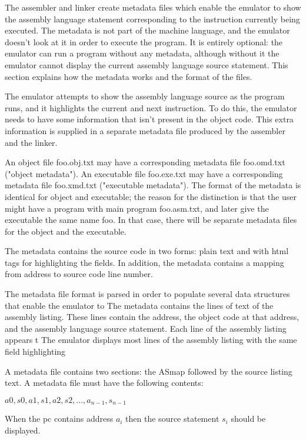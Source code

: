 \documentclass[11pt]{article}
\begin{document}
The assembler and linker create metadata files which enable the
emulator to show the assembly language statement corresponding to the
instruction currently being executed.  The metadata is not part of the
machine language, and the emulator doesn't look at it in order to
execute the program.  It is entirely optional: the emulator can run a
program without any metadata, although without it the emulator cannot
display the current assembly language source statement.  This section
explains how the metadata works and the format of the files.

The emulator attempts to show the assembly language source as the
program runs, and it highlights the current and next instruction.  To
do this, the emulator needs to have some information that isn't
present in the object code.  This extra information is supplied in a
separate metadata file produced by the assembler and the linker.

An object file foo.obj.txt may have a corresponding metadata file
foo.omd.txt ("object metadata").  An executable file foo.exe.txt may
have a corresponding metadata file foo.xmd.txt ("executable
metadata").  The format of the metadata is identical for object and
executable; the reason for the distinction is that the user might have
a program with main program foo.asm.txt, and later give the executable
the same name foo.  In that case, there will be separate metadata
files for the object and the executable.

  The metadata contains the source code in two forms:
plain text and with html tags for highlighting the fields.  In
addition, the metadata contains a mapping from address to source code
line number.

The metadata file format is parsed in order to populate several data
structures that enable the emulator to 
The metadata contains the lines of text of the assembly listing.
These lines contain the address, the object code at that address, and
the assembly language source statement.  Each line of the assembly
listing appears t  The emulator displays most
lines of the assembly listing with the same field highlighting

A metadata file contains two sections: the ASmap followed by the
source listing text.
A metadata file must have the following contents:

\(a0,s0,a1,s1,a2,s2, ..., a_{n-1},s_{n-1}\)

When the pc contains address \(a_i\) then the source statement \(s_i\)
should be displayed.
\end{document}
